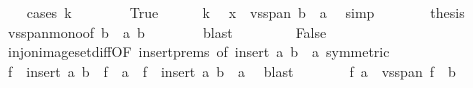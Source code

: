 \begin{isabellebody}
\ \ \isamarkupfalse%
\ {\isacharparenleft}{\kern0pt}cases\ {\isachardoublequoteopen}k\ {\isacharequal}{\kern0pt}\ {}{\isachardoublequoteclose}{\isacharparenright}{\kern0pt}\isanewline
\ \ \ \ \isamarkupfalse%
\ True\isanewline
\ \ \ \ \isamarkupfalse%
\ k\ \isamarkupfalse%
\ {\isachardoublequoteopen}x\ {\isasymin}\ vs{}{\isachardot}{\kern0pt}span\ {\isacharparenleft}{\kern0pt}b\ {\isacharminus}{\kern0pt}\ {\isacharbraceleft}{\kern0pt}a{\isacharbraceright}{\kern0pt}{\isacharparenright}{\kern0pt}{\isachardoublequoteclose}\ \isamarkupfalse%
\ simp\isanewline
\ \ \ \ \isamarkupfalse%
\ \isamarkupfalse%
\ {\isacharquery}{\kern0pt}thesis\ \isamarkupfalse%
\ vs{}{\isachardot}{\kern0pt}span{\isacharunderscore}{\kern0pt}mono{\isacharbrackleft}{\kern0pt}of\ {\isachardoublequoteopen}b\ {\isacharminus}{\kern0pt}\ {\isacharbraceleft}{\kern0pt}a{\isacharbraceright}{\kern0pt}{\isachardoublequoteclose}\ b{\isacharbrackright}{\kern0pt}\isanewline
\ \ \ \ \ \ \isamarkupfalse%
\ blast\isanewline
\ \ \isamarkupfalse%
\isanewline
\ \ \ \ \isamarkupfalse%
\ False\isanewline
\ \ \ \ \isamarkupfalse%
\ inj{\isacharunderscore}{\kern0pt}on{\isacharunderscore}{\kern0pt}image{\isacharunderscore}{\kern0pt}set{\isacharunderscore}{\kern0pt}diff{\isacharbrackleft}{\kern0pt}OF\ insert{\isachardot}{\kern0pt}prems{\isacharparenleft}{\kern0pt}{}{\isacharparenright}{\kern0pt}{\isacharcomma}{\kern0pt}\ of\ {\isachardoublequoteopen}insert\ a\ b\ {\isachardoublequoteclose}\ {\isachardoublequoteopen}{\isacharbraceleft}{\kern0pt}a{\isacharbraceright}{\kern0pt}{\isachardoublequoteclose}{\isacharcomma}{\kern0pt}\ symmetric{\isacharbrackright}{\kern0pt}\isanewline
\ \ \ \ \isamarkupfalse%
\ {\isachardoublequoteopen}f\ {\isacharbackquote}{\kern0pt}\ insert\ a\ b\ {\isacharminus}{\kern0pt}\ f\ {\isacharbackquote}{\kern0pt}\ {\isacharbraceleft}{\kern0pt}a{\isacharbraceright}{\kern0pt}\ {\isacharequal}{\kern0pt}\ f\ {\isacharbackquote}{\kern0pt}\ {\isacharparenleft}{\kern0pt}insert\ a\ b\ {\isacharminus}{\kern0pt}\ {\isacharbraceleft}{\kern0pt}a{\isacharbraceright}{\kern0pt}{\isacharparenright}{\kern0pt}{\isachardoublequoteclose}\ \isamarkupfalse%
\ blast\isanewline
\ \ \ \ \isamarkupfalse%
\ \isamarkupfalse%
\ {\isachardoublequoteopen}f\ a\ {\isasymnotin}\ vs{}{\isachardot}{\kern0pt}span\ {\isacharparenleft}{\kern0pt}f\ {\isacharbackquote}{\kern0pt}\ b{\isacharparenright}{\kern0pt}{\isachardoublequoteclose}\ \isanewline

\end{isabellebody}
